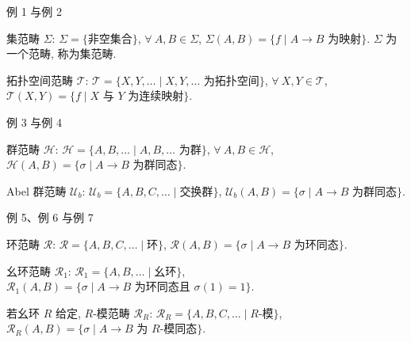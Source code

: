 \begin{frame}{例 1 与例 2}

\begin{eg}
集范畴 $\Sigma$:
$\Sigma = \{ \text{非空集合} \}$, $\forall\ A, B \in \Sigma$,
$\Sigma(A, B) = \{ f \mid A \to B \text{ 为映射} \}$.
$\Sigma$ 为一个范畴, 称为集范畴.
\end{eg}

\pause

\begin{eg}
拓扑空间范畴 $\mathcal{T}$:
$\mathcal{T} = \{ X, Y, \dots \mid X, Y, \dots \text{ 为拓扑空间} \}$,
$\forall\ X, Y \in \mathcal{T}$,
$\mathcal{T}(X, Y) = \{ f \mid X \text{ 与 } Y \text{ 为连续映射} \}$.
\end{eg}

\end{frame}


\begin{frame}{例 3 与例 4}

\begin{eg}
群范畴 $\mathcal{H}$:
$\mathcal{H} = \{ A, B, \dots \mid A, B, \dots \text{ 为群} \}$,
$\forall\ A, B \in \mathcal{H}$,
$\mathcal{H}(A, B) = \{ \sigma \mid A \to B \text{ 为群同态} \}$.
\end{eg}

\pause

\begin{eg}
Abel 群范畴 $\mathcal{U}_b$:
$\mathcal{U}_b = \{ A, B, C, \dots \mid \text{交换群} \}$,
$\mathcal{U}_b(A, B) = \{ \sigma \mid A \to B \text{ 为群同态} \}$.
\end{eg}

\end{frame}


\begin{frame}{例 5、例 6 与例 7}

\begin{eg}
环范畴 $\mathcal{R}$:
$\mathcal{R} = \{ A, B, C, \dots \mid \text{环} \}$,
$\mathcal{R}(A, B) = \{ \sigma \mid A \to B \text{ 为环同态} \}$.
\end{eg}

\begin{eg}
幺环范畴 $\mathcal{R}_1$:
$\mathcal{R}_1 = \{ A, B, \dots \mid \text{幺环} \}$,
$\mathcal{R}_1(A, B) = \{ \sigma \mid A \to B \text{ 为环同态且 }
\sigma(1) = 1 \}$.
\end{eg}

\pause

\begin{eg}
若幺环 $R$ 给定, $R$-模范畴 $\mathcal{R}_R$:
$\mathcal{R}_R = \{ A, B, C, \dots \mid R\text{-模} \}$,
$\mathcal{R}_R(A, B) = \{ \sigma \mid A \to B \text{ 为 } R\text{-模同态} \}$.
\end{eg}

\end{frame}

